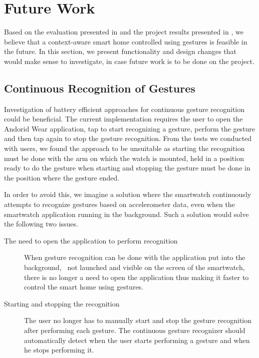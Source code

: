 \section{Future Work}
\label{sec:conclusion:future-work}

Based on the evaluation presented in  and the project results presented in , we believe that a context-aware smart home controlled using gestures is feasible in the future. 
In this section, we present functionality and design changes that would make sense to investigate, in case future work is to be done on the project.

\subsection{Continuous Recognition of Gestures}

Investigation of battery efficient approaches for continuous gesture recognition could be beneficial. The current implementation requires the user to open the Andorid Wear application, tap to start recognizing a gesture, perform the gesture and then tap again to stop the gesture recognition. From the tests we conducted with users, we found the approach to be unsuitable as starting the recognition must be done with the arm on which the watch is mounted, held in a position ready to do the gesture when starting and stopping the gesture must be done in the position where the gesture ended.

In order to avoid this, we imagine a solution where the smartwatch continuously attempts to recognize gestures based on accelerometer data, even when the smartwatch application running in the background. Such a solution would solve the following two issues.

\begin{description}
\item[The need to open the application to perform recognition] When gesture recognition can be done with the application put into the background, \ie~not launched and visible on the screen of the smartwatch, there is no longer a need to open the application thus making it faster to control the smart home using gestures.
\item[Starting and stopping the recognition] The user no longer has to manually start and stop the gesture recognition after performing each gesture. The continuous gesture recognizer should automatically detect when the user starts performing a gesture and when he stops performing it.
\end{description}

